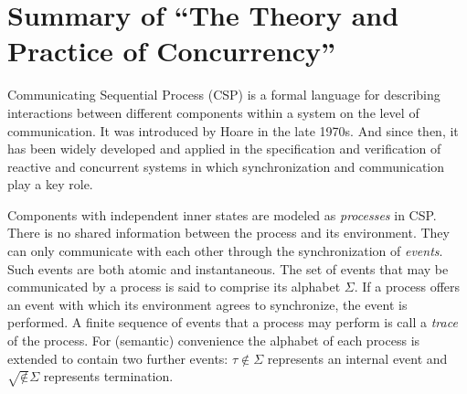 \documentclass{llncs}
\newcommand{\csptick}{\surd}
\newcommand{\csptau}{\tau}
\begin{document}
\section{Summary of ``The Theory and Practice of 
  Concurrency''\cite{Roscoe1997Theory}} 
  \label{section:CSP}

Communicating Sequential Process (CSP) is a formal language for describing
interactions between different components within a system on the level of
communication. It was introduced by Hoare in the late 1970s. And since then,
it has been widely developed and applied in the specification and verification
of reactive and concurrent systems in which synchronization and communication
play a key role.

Components with independent inner states are modeled as \emph{processes} in
CSP. There is no shared information between the process and its environment. They
can only communicate with each other through the synchronization of
\emph{events}. Such events are both atomic and instantaneous. The set
of events that may be communicated by a process is said to comprise its
alphabet $\Sigma$. If a process offers an event with which its environment
agrees to synchronize, the event is performed. A finite sequence of events that
a process may perform is call a \emph{trace} of the process. For (semantic)
convenience the alphabet of each process is extended to contain two further
events: $\csptau \notin \Sigma$ represents an internal event and $\csptick \notin
\Sigma$ represents termination.
\end{document}
